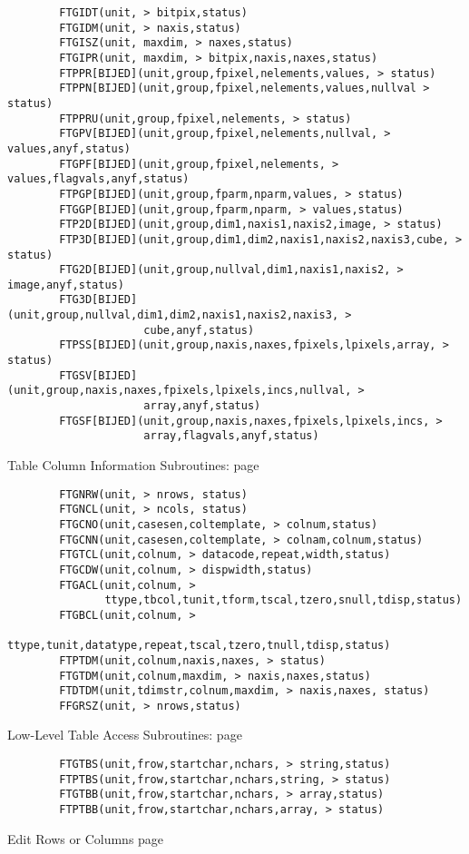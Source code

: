 \documentclass[11pt]{book}
\begin{document}
\begin{verbatim}
        FTGIDT(unit, > bitpix,status)
        FTGIDM(unit, > naxis,status)
        FTGISZ(unit, maxdim, > naxes,status)
        FTGIPR(unit, maxdim, > bitpix,naxis,naxes,status)
        FTPPR[BIJED](unit,group,fpixel,nelements,values, > status)
        FTPPN[BIJED](unit,group,fpixel,nelements,values,nullval > status)
        FTPPRU(unit,group,fpixel,nelements, > status)
        FTGPV[BIJED](unit,group,fpixel,nelements,nullval, > values,anyf,status)
        FTGPF[BIJED](unit,group,fpixel,nelements, > values,flagvals,anyf,status)
        FTPGP[BIJED](unit,group,fparm,nparm,values, > status)
        FTGGP[BIJED](unit,group,fparm,nparm, > values,status)
        FTP2D[BIJED](unit,group,dim1,naxis1,naxis2,image, > status)
        FTP3D[BIJED](unit,group,dim1,dim2,naxis1,naxis2,naxis3,cube, > status)
        FTG2D[BIJED](unit,group,nullval,dim1,naxis1,naxis2, > image,anyf,status)
        FTG3D[BIJED](unit,group,nullval,dim1,dim2,naxis1,naxis2,naxis3, >
                     cube,anyf,status)
        FTPSS[BIJED](unit,group,naxis,naxes,fpixels,lpixels,array, > status)
        FTGSV[BIJED](unit,group,naxis,naxes,fpixels,lpixels,incs,nullval, >
                     array,anyf,status)
        FTGSF[BIJED](unit,group,naxis,naxes,fpixels,lpixels,incs, >
                     array,flagvals,anyf,status)
\end{verbatim}
 Table Column Information Subroutines: page~\pageref{FTGCNO}

\begin{verbatim}
        FTGNRW(unit, > nrows, status)
        FTGNCL(unit, > ncols, status)
        FTGCNO(unit,casesen,coltemplate, > colnum,status)
        FTGCNN(unit,casesen,coltemplate, > colnam,colnum,status)
        FTGTCL(unit,colnum, > datacode,repeat,width,status)
        FTGCDW(unit,colnum, > dispwidth,status)
        FTGACL(unit,colnum, >
               ttype,tbcol,tunit,tform,tscal,tzero,snull,tdisp,status)
        FTGBCL(unit,colnum, >
               ttype,tunit,datatype,repeat,tscal,tzero,tnull,tdisp,status)
        FTPTDM(unit,colnum,naxis,naxes, > status)
        FTGTDM(unit,colnum,maxdim, > naxis,naxes,status)
        FTDTDM(unit,tdimstr,colnum,maxdim, > naxis,naxes, status)
        FFGRSZ(unit, > nrows,status)
\end{verbatim}
 Low-Level Table Access Subroutines: page~\pageref{FTGTBS}

\begin{verbatim}
        FTGTBS(unit,frow,startchar,nchars, > string,status)
        FTPTBS(unit,frow,startchar,nchars,string, > status)
        FTGTBB(unit,frow,startchar,nchars, > array,status)
        FTPTBB(unit,frow,startchar,nchars,array, > status)
\end{verbatim}
 Edit Rows or Columns page~\pageref{FTIROW}
\end{document}
